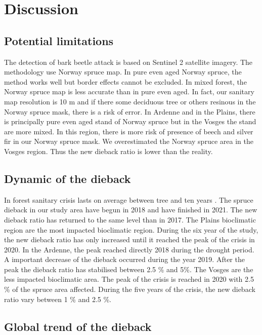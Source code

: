 \documentclass[3p,procedia]{elsarticle}
\begin{document}
\fi
 
  

\section{Discussion}

\subsection{Potential limitations}
The detection of bark beetle attack is based on Sentinel 2 satellite imagery.
The methodology use Norway spruce map. 
In pure even aged Norway spruce, the method works well but border effects cannot be excluded. 
In mixed forest, the Norway spruce map is less accurate than in pure even aged.
In fact, our sanitary map resolution is 10 m and if there some deciduous tree or others resinous in the Norway spruce mask, there is a risk of error.
In Ardenne and in the Plains, there is principally pure even aged stand of Norway spruce but in the Vosges the stand are more mixed.
In this region, there is more risk of presence of beech and silver fir in our Norway spruce mask.
We overestimated the Norway spruce area in the Vosges region.
Thus the new dieback ratio is lower than the reality.
 

\subsection{Dynamic of the dieback}
In forest sanitary crisis lasts on average between tree and ten years \citep{gauquelin_guide_2010}.
The spruce dieback in our study area have begun in 2018 and have finished in 2021.
The new dieback ratio has returned to the same level than in 2017.
The Plains bioclimatic region are the most impacted bioclimatic region.
During the six year of the study, the new dieback ratio has only increased until it reached the peak of the crisis in 2020.
In the Ardenne, the peak reached directly 2018 during the drought period.
A important decrease of the dieback occurred during the year 2019.
After the peak the dieback ratio has stabilised between 2.5 \% and 5\%.
The Vosges are the less impacted bioclimatic area. 
The peak of the crisis is reached in 2020 with 2.5 \% of the spruce area affected.
During the five years of the crisis, the new dieback ratio vary between 1 \% and 2.5 \%.


\subsection{Global trend of the dieback}
\end{document}
